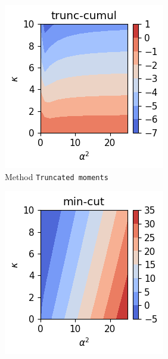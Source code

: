 \begin{figure}[h!]
    \centering
    \begin{subfigure}{0.32\linewidth}
        \centering
        \includegraphics[width=\linewidth]{Pics/H_Neg_Self_Kerr_and_losses_1_p_3_rule_trunc-cumul.pdf}
        \caption{Method \texttt{Truncated moments}}
        \label{fig:H_Neg_Self_Kerr_and_losses_1_p_3_rule_trunc-cumul}
    \end{subfigure}
    \hfill
    \begin{subfigure}{0.32\linewidth}
        \centering
        \includegraphics[width=\linewidth]{Pics/H_Neg_Self_Kerr_and_losses_1_p_3_rule_min-cut.pdf}

\end{subfigure}
\end{figure}
